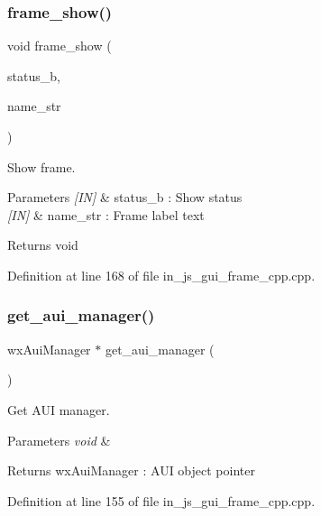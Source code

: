\subsubsection{frame\_show()}
{\footnotesize\ttfamily void frame\+\_\+show (\begin{DoxyParamCaption}\item[{bool}]{status\+\_\+b,  }\item[{wx\+String}]{name\+\_\+str }\end{DoxyParamCaption})}



Show frame. 


\begin{DoxyParams}{Parameters}
{\em \mbox{[}\+I\+N\mbox{]}} & status\+\_\+b \+: Show status \\
\hline
{\em \mbox{[}\+I\+N\mbox{]}} & name\+\_\+str \+: Frame label text \\
\hline
\end{DoxyParams}
\begin{DoxyReturn}{Returns}
void 
\end{DoxyReturn}


Definition at line 168 of file in\+\_\+js\+\_\+gui\+\_\+frame\+\_\+cpp.\+cpp.

\mbox{\label{group___g_u_i_ga0a532f834b1cca1b27d9a4d2c515d312}} 
\subsubsection{get\_aui\_manager()}
{\footnotesize\ttfamily wx\+Aui\+Manager $\ast$ get\+\_\+aui\+\_\+manager (\begin{DoxyParamCaption}\item[{void}]{ }\end{DoxyParamCaption})}



Get A\+UI manager. 


\begin{DoxyParams}{Parameters}
{\em void} & \\
\hline
\end{DoxyParams}
\begin{DoxyReturn}{Returns}
wx\+Aui\+Manager \+: A\+UI object pointer 
\end{DoxyReturn}


Definition at line 155 of file in\+\_\+js\+\_\+gui\+\_\+frame\+\_\+cpp.\+cpp.

\mbox{\label{group___g_u_i_gae91f7141333a9416e48983245441a64a}} 
